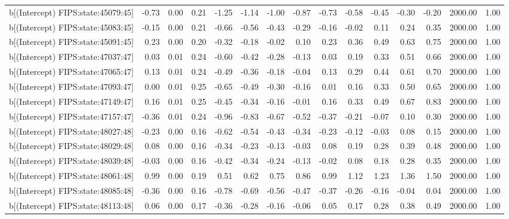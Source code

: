 \begin{table}[ht]
\begin{tabular}{rrrrrrrrrrrrrrr}
  b[(Intercept) FIPS:state:45079:45] & -0.73 & 0.00 & 0.21 & -1.25 & -1.14 & -1.00 & -0.87 & -0.73 & -0.58 & -0.45 & -0.30 & -0.20 & 2000.00 & 1.00 \\ 
  b[(Intercept) FIPS:state:45083:45] & -0.15 & 0.00 & 0.21 & -0.66 & -0.56 & -0.43 & -0.29 & -0.16 & -0.02 & 0.11 & 0.24 & 0.35 & 2000.00 & 1.00 \\ 
  b[(Intercept) FIPS:state:45091:45] & 0.23 & 0.00 & 0.20 & -0.32 & -0.18 & -0.02 & 0.10 & 0.23 & 0.36 & 0.49 & 0.63 & 0.75 & 2000.00 & 1.00 \\ 
  b[(Intercept) FIPS:state:47037:47] & 0.03 & 0.01 & 0.24 & -0.60 & -0.42 & -0.28 & -0.13 & 0.03 & 0.19 & 0.33 & 0.51 & 0.66 & 2000.00 & 1.00 \\ 
  b[(Intercept) FIPS:state:47065:47] & 0.13 & 0.01 & 0.24 & -0.49 & -0.36 & -0.18 & -0.04 & 0.13 & 0.29 & 0.44 & 0.61 & 0.70 & 2000.00 & 1.00 \\ 
  b[(Intercept) FIPS:state:47093:47] & 0.00 & 0.01 & 0.25 & -0.65 & -0.49 & -0.30 & -0.16 & 0.01 & 0.16 & 0.33 & 0.50 & 0.65 & 2000.00 & 1.00 \\ 
  b[(Intercept) FIPS:state:47149:47] & 0.16 & 0.01 & 0.25 & -0.45 & -0.34 & -0.16 & -0.01 & 0.16 & 0.33 & 0.49 & 0.67 & 0.83 & 2000.00 & 1.00 \\ 
  b[(Intercept) FIPS:state:47157:47] & -0.36 & 0.01 & 0.24 & -0.96 & -0.83 & -0.67 & -0.52 & -0.37 & -0.21 & -0.07 & 0.10 & 0.30 & 2000.00 & 1.00 \\ 
  b[(Intercept) FIPS:state:48027:48] & -0.23 & 0.00 & 0.16 & -0.62 & -0.54 & -0.43 & -0.34 & -0.23 & -0.12 & -0.03 & 0.08 & 0.15 & 2000.00 & 1.00 \\ 
  b[(Intercept) FIPS:state:48029:48] & 0.08 & 0.00 & 0.16 & -0.34 & -0.23 & -0.13 & -0.03 & 0.08 & 0.19 & 0.28 & 0.39 & 0.48 & 2000.00 & 1.00 \\ 
  b[(Intercept) FIPS:state:48039:48] & -0.03 & 0.00 & 0.16 & -0.42 & -0.34 & -0.24 & -0.13 & -0.02 & 0.08 & 0.18 & 0.28 & 0.35 & 2000.00 & 1.00 \\ 
  b[(Intercept) FIPS:state:48061:48] & 0.99 & 0.00 & 0.19 & 0.51 & 0.62 & 0.75 & 0.86 & 0.99 & 1.12 & 1.23 & 1.36 & 1.50 & 2000.00 & 1.00 \\ 
  b[(Intercept) FIPS:state:48085:48] & -0.36 & 0.00 & 0.16 & -0.78 & -0.69 & -0.56 & -0.47 & -0.37 & -0.26 & -0.16 & -0.04 & 0.04 & 2000.00 & 1.00 \\ 
  b[(Intercept) FIPS:state:48113:48] & 0.06 & 0.00 & 0.17 & -0.36 & -0.28 & -0.16 & -0.06 & 0.05 & 0.17 & 0.28 & 0.38 & 0.49 & 2000.00 & 1.00 \\ 

\end{tabular}
\end{table}

